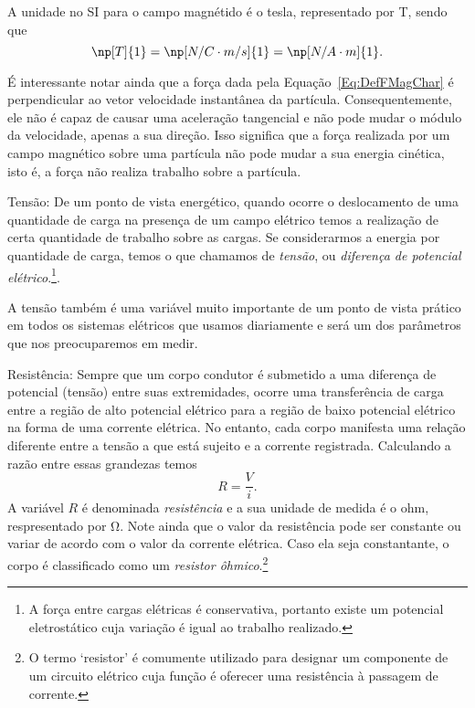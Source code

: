 \begin{description}
    A unidade no SI para o campo magnétido é o tesla, representado por T, sendo que
    \begin{equation}
        \np[T]{1} = \np[N/C\cdot m/s]{1} = \np[N/A\cdot m]{1}.
    \end{equation}
    
    É interessante notar ainda que a força dada pela Equação~\ref{Eq:DefFMagChar} é perpendicular ao vetor velocidade instantânea da partícula. Consequentemente, ele não é capaz de causar uma aceleração tangencial e não pode mudar o módulo da velocidade, apenas a sua direção. Isso significa que a força realizada por um campo magnético sobre uma partícula não pode mudar a sua energia cinética, isto é, a força não realiza trabalho sobre a partícula.
    
    \item{Tensão:} De um ponto de vista energético, quando ocorre o deslocamento de uma quantidade de carga na presença de um campo elétrico temos a realização de certa quantidade de trabalho sobre as cargas. Se considerarmos a energia por quantidade de carga, temos o que chamamos de \emph{tensão}, ou \emph{diferença de potencial elétrico}.\footnote{A força entre cargas elétricas é conservativa, portanto existe um potencial eletrostático cuja variação é igual ao trabalho realizado.}.
    
    A tensão também é uma variável muito importante de um ponto de vista prático em todos os sistemas elétricos que usamos diariamente e será um dos parâmetros que nos preocuparemos em medir.
    
    \item{Resistência:} Sempre que um corpo condutor é submetido a uma diferença de potencial (tensão) entre suas extremidades, ocorre uma transferência de carga entre a região de alto potencial elétrico para a região de baixo potencial elétrico na forma de uma corrente elétrica. No entanto, cada corpo manifesta uma relação diferente entre a tensão a que está sujeito e a corrente registrada. Calculando a razão entre essas grandezas temos
    \begin{equation}
        R = \frac{V}{i}.
    \end{equation}
    A variável $R$ é denominada \emph{resistência} e a sua unidade de medida é o ohm, respresentado por \si{\ohm}. Note ainda que o valor da resistência pode ser constante ou variar de acordo com o valor da corrente elétrica. Caso ela seja constantante, o corpo é classificado como um \emph{resistor ôhmico}.\footnote{O termo `resistor' é comumente utilizado para designar um componente de um circuito elétrico cuja função é oferecer uma resistência à passagem de corrente.}
    
\end{description}

